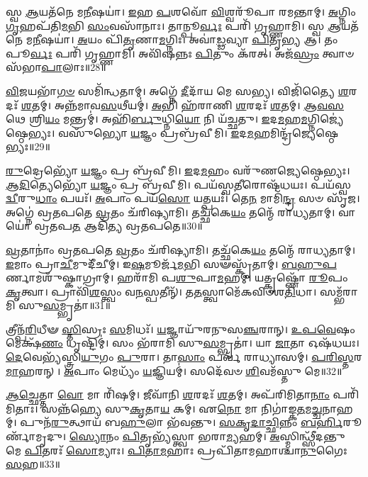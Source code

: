 𑌸𑍍𑌵 \ul{𑌆}\-𑌯𑌤᳴𑌨𑍇 𑌮\-\ul{𑌨𑍀}\-𑌷𑌯𑌾॑।
\-\ul{𑌇}\-𑌹 \ul{𑌪}\-𑌶𑌵𑍋᳴ \ul{𑌵𑌿}\-𑌶𑍍𑌵𑌰𑍂᳴𑌪𑌾 𑌰𑌮𑌨𑍍𑌤𑌾𑌮𑍍।
\-\ul{𑌅}\-𑌗𑍍𑌨𑌿𑌂 \ul{𑌗𑍃}\-𑌹𑌪᳴𑌤𑌿\-\ul{𑌮}\-𑌭𑌿 \ul{𑌸𑌂}\-𑌵𑌸𑌾᳴𑌨𑌾𑌃।
𑌤𑌾𑌨𑍍𑌪𑍂\-\ul{𑌰𑍍𑌵𑌃} 𑌪𑌰𑌿᳴ 𑌗𑍃𑌹𑍍𑌣𑌾𑌮𑌿।
𑌸𑍍𑌵 \ul{𑌆}\-𑌯𑌤᳴𑌨𑍇 𑌮\-\ul{𑌨𑍀}\-𑌷𑌯𑌾॑।
\-\ul{𑌅}\-𑌯𑌂 𑌪𑌿᳴\-\ul{𑌤𑍃}\-𑌣𑌾\-\ul{𑌮}\-𑌗𑍍𑌨𑌿𑌃।
𑌅𑌵𑌾॑\-\ul{𑌡𑍍𑌢}\-𑌵𑍍𑌯𑌾 \ul{𑌪𑌿}\-𑌤𑍃\-\ul{𑌭𑍍𑌯} 𑌆।
𑌤𑌂 𑌪𑍂\-\ul{𑌰𑍍𑌵𑌃} 𑌪𑌰𑌿᳴ 𑌗𑍃𑌹𑍍𑌣𑌾𑌮𑌿।
𑌅𑌵𑌿᳴𑌷𑌨𑍍𑌨𑌃 \ul{𑌪𑌿}\-𑌤𑍁𑌂 𑌕᳴𑌰𑌤𑍍।
𑌅𑌜᳴\-\ul{𑌸𑍍𑌰𑌂} 𑌤𑍍𑌵𑌾𑍞 𑌸᳴𑌭𑌾\-\ul{𑌪𑌾}\-𑌲𑌾𑌃॥28॥

\-\ul{𑌵𑌿}\-\-\ul{𑌜}\-𑌯𑌭𑌾᳴\-\ul{𑌗}\-\-\ul{𑍞} 𑌸𑌮𑌿᳴𑌨𑍍𑌧𑌤𑌾𑌮𑍍।
𑌅𑌗𑍍𑌨𑍇᳴ \ul{𑌦𑍀}\-𑌦𑌾᳴𑌯 𑌮𑍇 𑌸𑌭𑍍𑌯।
𑌵𑌿𑌜𑌿᳴𑌤𑍍𑌯𑍈 \ul{𑌶}\-𑌰𑌦𑌃᳴ \ul{𑌶}\-𑌤𑌮𑍍।
𑌅𑌨𑍍𑌨᳴𑌮𑌾𑌵\-\ul{𑌸}\-𑌥𑍀𑌯𑌮𑍍॑।
\-\ul{𑌅}\-𑌭𑌿 𑌹᳴𑌰𑌾𑌣𑌿 \ul{𑌶}\-𑌰𑌦𑌃᳴ \ul{𑌶}\-𑌤𑌮𑍍।
\-\ul{𑌆}\-\-\ul{𑌵}\-\-\ul{𑌸}\-𑌥𑍇 𑌶𑍍𑌰𑌿\-\ul{𑌯𑌂} 𑌮𑌨𑍍𑌤𑍍𑌰𑌮𑍍॑।
𑌅𑌹𑌿᳴\-\ul{𑌰𑍍𑌬𑍁}\-𑌧𑍍𑌨𑌿\-\ul{𑌯𑍋} 𑌨𑌿 𑌯᳴𑌚𑍍𑌛𑌤𑍁।
\-\ul{𑌇}\-𑌦\-\ul{𑌮}\-𑌹\-\ul{𑌮}\-𑌗𑍍𑌨𑌿𑌜𑍍𑌯𑍇॑𑌷𑍍𑌠𑍇𑌭𑍍𑌯𑌃।
𑌵𑌸𑍁᳴𑌭𑍍𑌯𑍋 \ul{𑌯}\-𑌜𑍍𑌞𑌂 𑌪𑍍𑌰𑌬𑍍𑌰᳴𑌵𑍀𑌮𑌿।
\-\ul{𑌇}\-𑌦\-\ul{𑌮}\-𑌹𑌮𑌿𑌨𑍍𑌦𑍍𑌰᳴𑌜𑍍𑌯𑍇𑌷𑍍𑌠𑍇𑌭𑍍𑌯𑌃॥29॥

\-\ul{𑌰𑍁}\-𑌦𑍍𑌰𑍇𑌭𑍍𑌯𑍋᳴ \ul{𑌯}\-𑌜𑍍𑌞𑌂 𑌪𑍍𑌰 𑌬𑍍𑌰᳴𑌵𑍀𑌮𑌿।
\-\ul{𑌇}\-𑌦\-\ul{𑌮}\-𑌹𑌂 𑌵𑌰𑍁᳴𑌣𑌜𑍍𑌯𑍇𑌷𑍍𑌠𑍇𑌭𑍍𑌯𑌃।
\-\ul{𑌆}\-\-\ul{𑌦𑌿}\-𑌤𑍍𑌯𑍇𑌭𑍍𑌯𑍋᳴ \ul{𑌯}\-𑌜𑍍𑌞𑌂 𑌪𑍍𑌰 𑌬𑍍𑌰᳴𑌵𑍀𑌮𑌿।
𑌪𑌯᳴𑌸𑍍𑌵\-\ul{𑌤𑍀}\-𑌰𑍋𑌷᳴𑌧𑌯𑌃।
𑌪𑌯᳴𑌸𑍍𑌵\-\ul{𑌦𑍍𑌵𑍀}\-𑌰𑍁\-\ul{𑌧𑌾𑌂} 𑌪𑌯𑌃᳴।
\-\ul{𑌅}\-𑌪𑌾𑌂 𑌪𑌯᳴\-\ul{𑌸𑍋} 𑌯𑌤𑍍𑌪𑌯𑌃᳴।
𑌤𑍇\-\ul{𑌨} 𑌮𑌾𑌮𑌿᳴\-\ul{𑌨𑍍𑌦𑍍𑌰} 𑌸𑍞 𑌸𑍃᳴𑌜।
𑌅𑌗𑍍𑌨𑍇॑ 𑌵𑍍𑌰𑌤𑌪𑌤𑍇 \ul{𑌵𑍍𑌰}\-𑌤𑌂 𑌚᳴𑌰𑌿𑌷𑍍𑌯𑌾𑌮𑌿।
𑌤𑌚𑍍𑌛᳴𑌕𑍇\-\ul{𑌯𑌂} 𑌤𑌨𑍍𑌮𑍇᳴ 𑌰𑌾𑌧𑍍𑌯𑌤𑌾𑌮𑍍।
𑌵𑌾𑌯𑍋॑ 𑌵𑍍𑌰𑌤𑌪\-\ul{𑌤} 𑌆𑌦𑌿᳴𑌤𑍍𑌯 𑌵𑍍𑌰𑌤𑌪𑌤𑍇॥30॥

\-\ul{𑌵𑍍𑌰}\-𑌤𑌾𑌨𑌾𑌂॑ 𑌵𑍍𑌰𑌤𑌪𑌤𑍇 \ul{𑌵𑍍𑌰}\-𑌤𑌂 𑌚᳴𑌰𑌿𑌷𑍍𑌯𑌾𑌮𑌿।
𑌤𑌚𑍍𑌛᳴𑌕𑍇\-\ul{𑌯𑌂} 𑌤𑌨𑍍𑌮𑍇᳴ 𑌰𑌾𑌧𑍍𑌯𑌤𑌾𑌮𑍍।
\-\ul{𑌇}\-𑌮𑌾𑌂 𑌪𑍍𑌰𑌾\-\ul{𑌚𑍀}\-𑌮𑍁𑌦𑍀᳴𑌚𑍀𑌮𑍍।
𑌇\-\ul{𑌷}\-𑌮𑍂𑌰𑍍𑌜᳴\-\ul{𑌮}\-𑌭𑌿 𑌸𑍟𑌸𑍍𑌕𑍃᳴𑌤𑌾𑌮𑍍।
\-\ul{𑌬}\-\-\ul{𑌹𑍁}\-\-\ul{𑌪}\-𑌰𑍍𑌣𑌾𑌮𑌶𑍁᳴𑌷𑍍𑌕𑌾𑌗𑍍𑌰𑌾𑌮𑍍।
𑌹𑌰𑌾᳴𑌮𑌿 𑌪\-\ul{𑌶𑍁}\-𑌪𑌾\-\ul{𑌮}\-𑌹𑌮𑍍।
𑌯𑌤𑍍𑌕𑍃𑌷𑍍𑌣𑍋᳴ \ul{𑌰𑍂}\-𑌪𑌂 \ul{𑌕𑍃}\-𑌤𑍍𑌵𑌾।
𑌪𑍍𑌰𑌾𑌵𑌿᳴\-\ul{𑌶}\-𑌸𑍍𑌤𑍍𑌵𑌂 𑌵\-\ul{𑌨}\-𑌸𑍍𑌪𑌤𑍀𑌨𑍍᳴।
𑌤\-\ul{𑌤}\-𑌸𑍍𑌤𑍍𑌵𑌾𑌮𑍇᳴𑌕𑌵𑌿𑍞𑌶\-\ul{𑌤𑌿}\-𑌧𑌾।
𑌸𑌮𑍍𑌭᳴𑌰𑌾𑌮𑌿 𑌸𑍁\-\ul{𑌸}\-𑌮𑍍𑌭𑍃𑌤𑌾॑॥31॥

𑌤𑍍𑌰𑍀𑌨𑍍𑌪᳴\-\ul{𑌰𑌿}\-𑌧𑍀𑍟 \ul{𑌸𑍍𑌤𑌿}\-𑌸𑍍𑌰𑌃 \ul{𑌸}\-𑌮𑌿𑌧𑌃᳴।
\-\ul{𑌯}\-𑌜𑍍𑌞𑌾𑌯𑍁᳴𑌰𑌨𑍁\-𑌸\-\ul{𑌞𑍍𑌚}\-𑌰𑌾𑌨𑍍।
\-\ul{𑌉}\-\-\ul{𑌪}\-\-\ul{𑌵𑍇}\-𑌷𑌂 𑌮𑍇𑌕𑍍𑌷᳴\-\ul{𑌣𑌂} 𑌧𑍃𑌷𑍍𑌟𑌿𑌮𑍍॑।
𑌸𑌂 𑌭᳴𑌰𑌾𑌮𑌿 𑌸𑍁\-\ul{𑌸}\-𑌮𑍍𑌭𑍃𑌤𑌾॑।
𑌯𑌾 \ul{𑌜𑌾}\-𑌤𑌾 𑌓𑌷᳴𑌧𑌯𑌃।
\-\ul{𑌦𑍇}\-𑌵𑍇𑌭𑍍𑌯᳴𑌸𑍍𑌤𑍍𑌰𑌿\-\ul{𑌯𑍁}\-𑌗𑌂 \ul{𑌪𑍁}\-𑌰𑌾।
𑌤𑌾\-\ul{𑌸𑌾𑌂} 𑌪𑌰𑍍𑌵᳴ 𑌰𑌾𑌧𑍍𑌯𑌾𑌸𑌮𑍍।
\-\ul{𑌪}\-\-\ul{𑌰𑌿}\-\-\ul{𑌸𑍍𑌤}\-𑌰\-\ul{𑌮𑌾}\-𑌹𑌰𑌨𑍍।
\-\ul{𑌅}\-𑌪𑌾𑌂 𑌮𑍇𑌧𑍍𑌯𑌂᳴ \ul{𑌯}\-𑌜𑍍𑌞𑌿𑌯𑌮𑍍॑।
𑌸𑌦𑍇᳴𑌵𑍞 \ul{𑌶𑌿}\-𑌵𑌮᳴𑌸𑍍𑌤𑍁 𑌮𑍇॥32॥

\-\ul{𑌆}\-\-\ul{𑌚𑍍𑌛𑍇}\-𑌤𑍍𑌤𑌾 \ul{𑌵𑍋} 𑌮𑌾 𑌰𑌿᳴𑌷𑌮𑍍।
𑌜𑍀𑌵𑌾᳴𑌨𑌿 \ul{𑌶}\-𑌰𑌦𑌃᳴ \ul{𑌶}\-𑌤𑌮𑍍।
𑌅𑌪᳴𑌰𑌿𑌮𑌿𑌤𑌾\-\ul{𑌨𑌾𑌂} 𑌪𑌰𑌿᳴𑌮𑌿𑌤𑌾𑌃।
𑌸𑌨𑍍𑌨᳴𑌹𑍍𑌯𑍇 𑌸𑍁\-\ul{𑌕𑍃}\-𑌤𑌾\-\ul{𑌯} 𑌕𑌮𑍍।
𑌏\-\ul{𑌨𑍋} 𑌮𑌾 𑌨𑌿𑌗𑌾॑𑌙𑍍𑌕\-\ul{𑌤}\-𑌮\-\ul{𑌚𑍍𑌚}\-𑌨𑌾𑌹𑌮𑍍।
𑌪𑍁𑌨᳴\-\ul{𑌰𑍁}\-𑌤𑍍𑌥𑌾𑌯᳴ 𑌬\-\ul{𑌹𑍁}\-𑌲𑌾 𑌭᳴𑌵𑌨𑍍𑌤𑍁।
\-\ul{𑌸}\-\-\ul{𑌕𑍃}\-\-\ul{𑌦𑌾}\-\-\ul{𑌚𑍍𑌛𑌿}\-𑌨𑍍𑌨𑌂 \ul{𑌬}\-\-\ul{𑌰𑍍}\-𑌹𑌿𑌰𑍂𑌰𑍍𑌣𑌾᳴𑌮𑍃𑌦𑍁।
\-\ul{𑌸𑍍𑌯𑍋}\-𑌨𑌂 \ul{𑌪𑌿}\-𑌤𑍃𑌭𑍍𑌯᳴𑌸𑍍𑌤𑍍𑌵𑌾 𑌭𑌰𑌾\-\ul{𑌮𑍍𑌯}\-𑌹𑌮𑍍।
\-\ul{𑌅}\-𑌸𑍍𑌮𑌿𑌨𑍍𑌥𑍍𑌸𑍀᳴𑌦𑌨𑍍𑌤𑍁 𑌮𑍇 \ul{𑌪𑌿}\-𑌤𑌰𑌃᳴ \ul{𑌸𑍋}\-𑌮𑍍𑌯𑌾𑌃।
\-\ul{𑌪𑌿}\-\-\ul{𑌤𑌾}\-\-\ul{𑌮}\-𑌹𑌾𑌃 𑌪𑍍𑌰𑌪𑌿᳴𑌤𑌾𑌮𑌹𑌾𑌶𑍍𑌚𑌾\-\ul{𑌨𑍁}\-𑌗𑍈𑌃 \ul{𑌸}\-𑌹॥33॥

